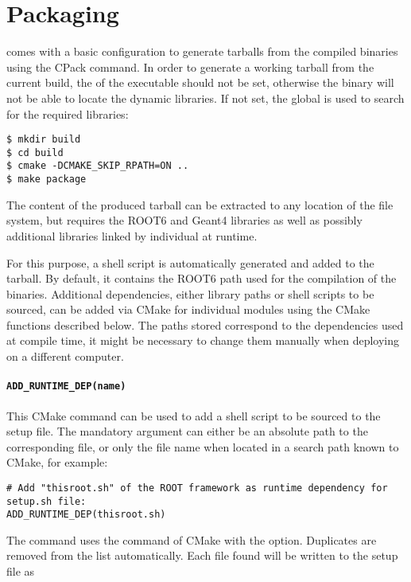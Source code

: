 \section{Packaging}
\label{sec:packaging}
\corry comes with a basic configuration to generate tarballs from the compiled binaries using the CPack command. In order to generate a working tarball from the current \corry build, the  of the executable should not be set, otherwise the  binary will not be able to locate the dynamic libraries. If not set, the global  is used to search for the required libraries:

\begin{verbatim}
$ mkdir build
$ cd build
$ cmake -DCMAKE_SKIP_RPATH=ON ..
$ make package
\end{verbatim}

The content of the produced tarball can be extracted to any location of the file system, but requires the ROOT6 and Geant4 libraries as well as possibly additional libraries linked by individual at runtime.

For this purpose, a  shell script is automatically generated and added to the tarball.
By default, it contains the ROOT6 path used for the compilation of the binaries.
Additional dependencies, either library paths or shell scripts to be sourced, can be added via CMake for individual modules using the CMake functions described below.
The paths stored correspond to the dependencies used at compile time, it might be necessary to change them manually when deploying on a different computer.

\paragraph{\texttt{\textbf{ADD\_RUNTIME\_DEP(name)}}}

This CMake command can be used to add a shell script to be sourced to the setup file.
The mandatory argument  can either be an absolute path to the corresponding file, or only the file name when located in a search path known to CMake, for example:

\begin{verbatim}
# Add "thisroot.sh" of the ROOT framework as runtime dependency for setup.sh file:
ADD_RUNTIME_DEP(thisroot.sh)
\end{verbatim}

The command uses the  command of CMake with the  option.
Duplicates are removed from the list automatically.
Each file found will be written to the setup file as

